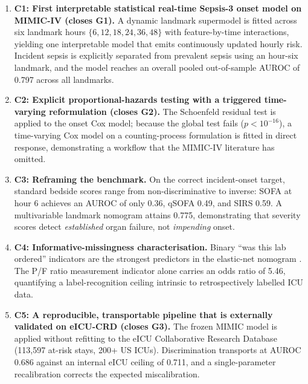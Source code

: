 \begin{enumerate}
  \item \textbf{C1: First interpretable statistical real-time Sepsis-3 onset
  model on MIMIC-IV (closes G1).} A dynamic landmark supermodel
  \cite{vanhouwelingen2007landmark,fries2023dynamiclm} is fitted across six
  landmark hours $\{6, 12, 18, 24, 36, 48\}$ with feature-by-time interactions,
  yielding one interpretable model that emits continuously updated hourly risk.
  Incident sepsis is explicitly separated from prevalent sepsis using an
  hour-six landmark, and the model reaches an overall pooled out-of-sample
  AUROC of 0.797 across all landmarks.

  \item \textbf{C2: Explicit proportional-hazards testing with a triggered
  time-varying reformulation (closes G2).} The Schoenfeld residual test is
  applied to the onset Cox model; because the global test fails ($p < 10^{-16}$),
  a time-varying Cox model on a counting-process formulation is fitted in direct
  response, demonstrating a workflow that the MIMIC-IV literature has omitted.

  \item \textbf{C3: Reframing the benchmark.} On the correct incident-onset
  target, standard bedside scores range from non-discriminative to inverse: SOFA
  at hour 6 achieves an AUROC of only 0.36, qSOFA 0.49, and SIRS 0.59. A
  multivariable landmark nomogram attains 0.775, demonstrating that severity
  scores detect \emph{established} organ failure, not \emph{impending} onset.

  \item \textbf{C4: Informative-missingness characterisation.} Binary ``was
  this lab ordered'' indicators are the strongest predictors in the elastic-net
  nomogram \cite{groenwold2020missingness,singh2021missingness}. The P/F ratio
  measurement indicator alone carries an odds ratio of 5.46, quantifying a
  label-recognition ceiling intrinsic to retrospectively labelled ICU data.

  \item \textbf{C5: A reproducible, transportable pipeline that is externally
  validated on eICU-CRD (closes G3).} The frozen MIMIC model is applied
  without refitting to the eICU Collaborative Research Database
  \cite{pollard2018eicu} (113{,}597 at-risk stays, 200+ US ICUs).
  Discrimination transports at AUROC 0.686 against an internal eICU ceiling of
  0.711, and a single-parameter recalibration corrects the expected
  miscalibration.
\end{enumerate}

